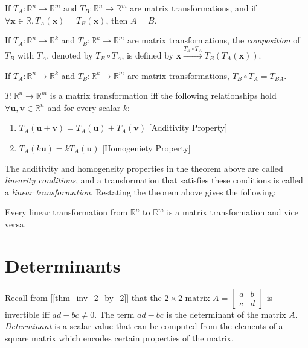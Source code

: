 \documentclass{report}
\begin{document}
		\begin{thm}
			If $T_A:\mathbb{R}^n \rightarrow \mathbb{R}^m$ and $T_B:\mathbb{R}^n \rightarrow \mathbb{R}^m$ are matrix transformations, and if $\forall \bm{x} \in \mathbb{R}, T_A(\bm{x})=T_B(\bm{x})$, then $A=B$.
		\end{thm}
		
		\begin{defn}
			If $T_A:\mathbb{R}^n \rightarrow \mathbb{R}^k$ and $T_B:\mathbb{R}^k \rightarrow \mathbb{R}^m$ are matrix transformations, the \emph{composition} of $T_B$ with $T_A$, denoted by $T_B \circ T_A$, is defined by $\bm{x} \xrightarrow{T_B \circ T_A} T_B(T_A(\bm{x}))$.
		\end{defn}
		
		\begin{thm}
			If $T_A:\mathbb{R}^n \rightarrow \mathbb{R}^k$ and $T_B:\mathbb{R}^k \rightarrow \mathbb{R}^m$ are matrix transformations, $T_B \circ T_A=T_{BA}$.
		\end{thm}
		
		\begin{thm}
			$T:\mathbb{R}^n\rightarrow\mathbb{R}^m$ is a matrix transformation iff the following relationships hold $\forall \bm{u}, \bm{v} \in \mathbb{R}^n$ and for every scalar $k$:
			\begin{enumerate}
				\item $T_A(\bm{u}+\bm{v})=T_A(\bm{u})+T_A(\bm{v})$ [Additivity Property]
				\item $T_A(k\bm{u})=kT_A(\bm{u})$ [Homogeniety Property]
			\end{enumerate}
		\end{thm}
		
		The additivity and homogeneity properties in the theorem above are called \emph{linearity conditions}, and a transformation that satisfies these conditions is called a \emph{linear transformation}. Restating the theorem above gives the following:
		
		\begin{thm}
			Every linear transformation from $\mathbb{R}^n$ to $\mathbb{R}^m$ is a matrix transformation and vice versa.
		\end{thm}
	
	\section{Determinants}
		Recall from [\ref{thm_inv_2_by_2}] that the $2 \times 2$ matrix $A=\begin{bmatrix} a & b \\ c & d \end{bmatrix}$ is invertible iff $ad-bc \ne 0$. The term $ad-bc$ is the determinant of the matrix $A$. \emph{Determinant} is a scalar value that can be computed from the elements of a square matrix which encodes certain properties of the matrix.
\end{document}
